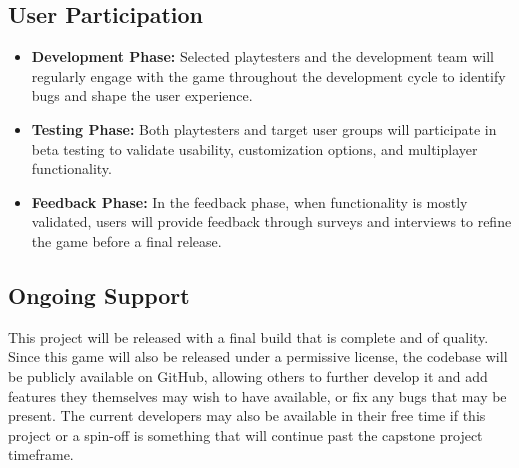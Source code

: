 \subsection{User Participation}

\begin{itemize}
	\item \textbf{Development Phase:} Selected playtesters and the development team will regularly engage with the game throughout the development cycle to identify bugs and shape the user experience.
	\item \textbf{Testing Phase:} Both playtesters and target user groups will participate in beta testing to validate usability, customization options, and multiplayer functionality.
	\item \textbf{Feedback Phase:} In the feedback phase, when functionality is mostly validated, users will provide feedback through surveys and interviews to refine the game before a final release.
\end{itemize}

\subsection{Ongoing Support}

This project will be released with a final build that is complete and of quality. Since this game will also be released under a permissive license, the codebase will be publicly available on GitHub, allowing others to further develop it and add features they themselves may wish to have available, or fix any bugs that may be present. The current developers may also be available in their free time if this project or a spin-off is something that will continue past the capstone project timeframe.
